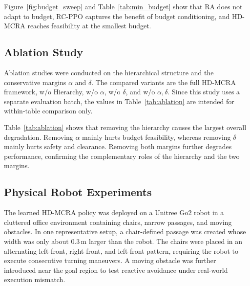 \documentclass[conference]{IEEEtran}
\begin{document}
Figure~\ref{fig:budget_sweep} and Table~\ref{tab:min_budget} show that RA does not adapt to budget, RC-PPO captures the benefit of budget conditioning, and HD-MCRA reaches feasibility at the smallest budget.

\subsection{Ablation Study}

Ablation studies were conducted on the hierarchical structure and the conservative margins $\alpha$ and $\delta$. The compared variants are the full HD-MCRA framework, w/o Hierarchy, w/o $\alpha$, w/o $\delta$, and w/o $\alpha,\delta$. Since this study uses a separate evaluation batch, the values in Table~\ref{tab:ablation} are intended for within-table comparison only.

\begin{table}[t]
\caption{Ablation study on hierarchy and conservative margins.}
\label{tab:ablation}
\centering
{}
\end{table}

Table~\ref{tab:ablation} shows that removing the hierarchy causes the largest overall degradation. Removing $\alpha$ mainly hurts budget feasibility, whereas removing $\delta$ mainly hurts safety and clearance. Removing both margins further degrades performance, confirming the complementary roles of the hierarchy and the two margins.

\subsection{Physical Robot Experiments}

The learned HD-MCRA policy was deployed on a Unitree Go2 robot in a cluttered office environment containing chairs, narrow passages, and moving obstacles. In one representative setup, a chair-defined passage was created whose width was only about $0.3\,\mathrm{m}$ larger than the robot. The chairs were placed in an alternating left-front, right-front, and left-front pattern, requiring the robot to execute consecutive turning maneuvers. A moving obstacle was further introduced near the goal region to test reactive avoidance under real-world execution mismatch.
\end{document}
